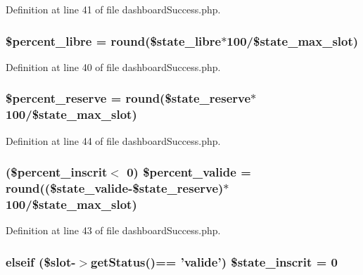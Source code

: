 Definition at line 41 of file dashboard\-Success.\-php.

\hypertarget{dashboard_success_8php_aeedf724f187110e0b5f9c28ee654577b}{
\subsubsection[{\$percent\-\_\-libre}]{\setlength{\rightskip}{0pt plus 5cm}\$percent\-\_\-libre = round(\$state\-\_\-libre$\ast$100/\$state\-\_\-max\-\_\-slot)}}\label{dashboard_success_8php_aeedf724f187110e0b5f9c28ee654577b}


Definition at line 40 of file dashboard\-Success.\-php.

\hypertarget{dashboard_success_8php_a23da4a29d9c1250ffead2a95108677d3}{
\subsubsection[{\$percent\-\_\-reserve}]{\setlength{\rightskip}{0pt plus 5cm}\$percent\-\_\-reserve = round(\$state\-\_\-reserve$\ast$100/\$state\-\_\-max\-\_\-slot)}}\label{dashboard_success_8php_a23da4a29d9c1250ffead2a95108677d3}


Definition at line 44 of file dashboard\-Success.\-php.

\hypertarget{dashboard_success_8php_aea43f590fe7a34919eabb2ed29d8aa0d}{
\subsubsection[{\$percent\-\_\-valide}]{ (\$percent\-\_\-inscrit$<$ 0) \$percent\-\_\-valide = round((\$state\-\_\-valide-\/\$state\-\_\-reserve)$\ast$100/\$state\-\_\-max\-\_\-slot)}}\label{dashboard_success_8php_aea43f590fe7a34919eabb2ed29d8aa0d}


Definition at line 43 of file dashboard\-Success.\-php.

\hypertarget{dashboard_success_8php_a60be82fa65f561e562585794494783c9}{
\subsubsection[{\$state\-\_\-inscrit}]{\setlength{\rightskip}{0pt plus 5cm}elseif (\$slot-\/$>$get\-Status()== 'valide') \$state\-\_\-inscrit = 0}}\label{dashboard_success_8php_a60be82fa65f561e562585794494783c9}



